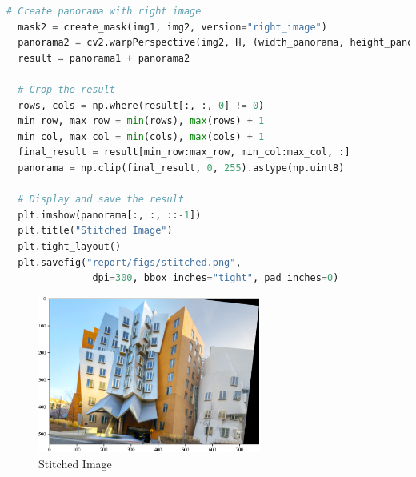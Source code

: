 \documentclass[11pt,a4paper]{article}
\begin{document}
\begin{lstlisting}[language=Python, caption=Matching keypoints and stitching images]
  # Create panorama with right image
  mask2 = create_mask(img1, img2, version="right_image")
  panorama2 = cv2.warpPerspective(img2, H, (width_panorama, height_panorama)) * mask2
  result = panorama1 + panorama2

  # Crop the result
  rows, cols = np.where(result[:, :, 0] != 0)
  min_row, max_row = min(rows), max(rows) + 1
  min_col, max_col = min(cols), max(cols) + 1
  final_result = result[min_row:max_row, min_col:max_col, :]
  panorama = np.clip(final_result, 0, 255).astype(np.uint8)

  # Display and save the result
  plt.imshow(panorama[:, :, ::-1])
  plt.title("Stitched Image")
  plt.tight_layout()
  plt.savefig("report/figs/stitched.png",
               dpi=300, bbox_inches="tight", pad_inches=0)
\end{lstlisting}

\begin{figure}[H]
    \centering
    \includegraphics[width=0.65\textwidth]{figs/stitched.png}
    \caption{Stitched Image}
  \end{figure}
\end{document}
